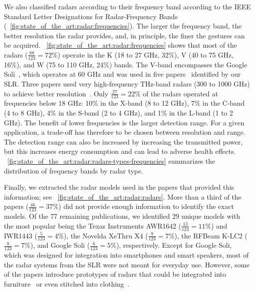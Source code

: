 We also classified radars according to their frequency band according to the IEEE Standard Letter Designations for Radar-Frequency Bands~\cite{IEEE:2020} (\fig~\ref{fig:state_of_the_art:radar:frequencies}). The larger the frequency band, the better resolution the radar provides, and, in principle, the finer the gestures can be acquired. \fig~\ref{fig:state_of_the_art:radar:frequencies} shows that most of the radars ($\frac{88}{123} = 72\%$) operate in the K (18 to 27 GHz, 32\%), V (40 to 75 GHz, 16\%), and W (75 to 110 GHz, 24\%) bands. The V-band encompasses the Google Soli~\cite{Lien:2016}, which operates at 60 GHz and was used in five papers~\cite{Lien:2016,Wang:2016,Copic:2019,Berenguer:2019,Choi:2019} identified by our SLR. Three papers used very high-frequency THz-band radars (300 to 1000 GHz) to achieve better resolution~\cite{Wang:2019b,Wang:2020b,Zhou:2018a}. Only $\frac{27}{123}=22\%$ of the radars operated at frequencies below 18 GHz:
10\% in the X-band (8 to 12 GHz),
7\% in the C-band (4 to 8 GHz),
4\% in the S-band (2 to 4 GHz),
and 1\% in the L-band (1 to 2 GHz). The benefit of lower frequencies is the larger detection range. For a given application, a trade-off has therefore to be chosen between resolution and range. The detection range can also be increased by increasing the transmitted power, but this increases energy consumption and can lead to adverse health effects. 
\fig~\ref{fig:state_of_the_art:radar:radars-types-frequencies} summarizes the distribution of frequency bands by radar type.

Finally, we extracted the radar models used in the papers that provided this information; see \fig~\ref{fig:state_of_the_art:radar:radars}. %
More than a third of the papers ($\frac{46}{123} = 37\%$) did not provide enough information to identify the exact models. Of the 77 remaining publications, we identified 29 unique models %
with the most popular being the Texas Instruments AWR1642 ($\frac{13}{123} = 11\%$) and IWR1443 ($\frac{5}{123} = 4\%$), the Novelda XeThru X4 ($\frac{9}{123} = 7\%$), the RFBeam K-LC2 ($\frac{8}{123} = 7\%$), and Google Soli ($\frac{6}{123} = 5\%$), respectively. Except for Google Soli, which was designed for integration into smartphones and smart speakers, most of the radar systems from the SLR were not meant for everyday use. However, some of the papers introduce prototypes of radars that could be integrated into furniture~\cite{Mcintosh:2017} or even stitched into clothing~\cite{Wu:2020}.

